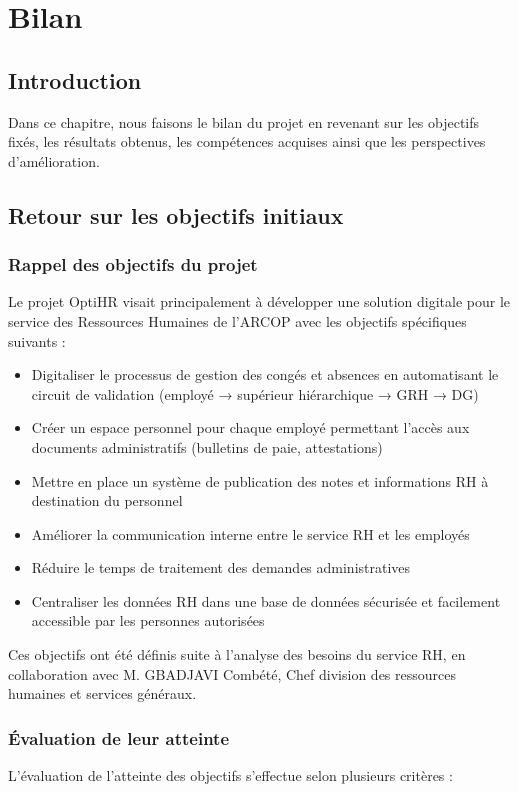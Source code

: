 \chapter{Bilan}
\clearpage

\section{Introduction}
Dans ce chapitre, nous faisons le bilan du projet en revenant sur les objectifs fixés, les résultats obtenus, les compétences acquises ainsi que les perspectives d'amélioration.\section{Retour sur les objectifs initiaux}

\subsection{Rappel des objectifs du projet}
Le projet OptiHR visait principalement à développer une solution digitale pour le service des Ressources Humaines de l'ARCOP avec les objectifs spécifiques suivants :

\begin{itemize}
    \item Digitaliser le processus de gestion des congés et absences en automatisant le circuit de validation (employé → supérieur hiérarchique → GRH → DG)
    \item Créer un espace personnel pour chaque employé permettant l'accès aux documents administratifs (bulletins de paie, attestations)
    \item Mettre en place un système de publication des notes et informations RH à destination du personnel
    \item Améliorer la communication interne entre le service RH et les employés
    \item Réduire le temps de traitement des demandes administratives 
    \item Centraliser les données RH dans une base de données sécurisée et facilement accessible par les personnes autorisées
\end{itemize}

Ces objectifs ont été définis suite à l'analyse des besoins du service RH, en collaboration avec M. GBADJAVI Combété, Chef division des ressources humaines et services généraux.

\subsection{Évaluation de leur atteinte}
L'évaluation de l'atteinte des objectifs s'effectue selon plusieurs critères :

